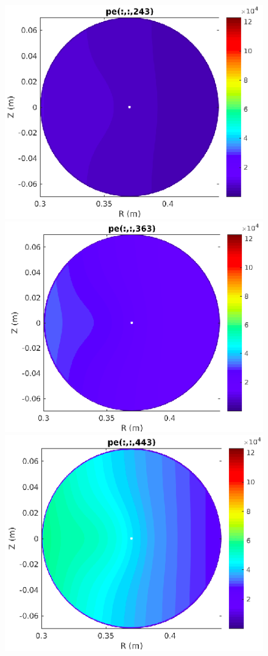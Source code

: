 \documentclass[12pt,oneside,a4paper]{abntex2}
\begin{document}
\begin{figure}[H]
\includegraphics[scale=0.4]{../SImulacao_breakdown/Adaptacao_nova/explicito/p243.png} 
\includegraphics[scale=0.4]{../SImulacao_breakdown/Adaptacao_nova/explicito/p363.png} 
\includegraphics[scale=0.4]{../SImulacao_breakdown/Adaptacao_nova/explicito/p443.png} 

\end{figure}
\end{document}

